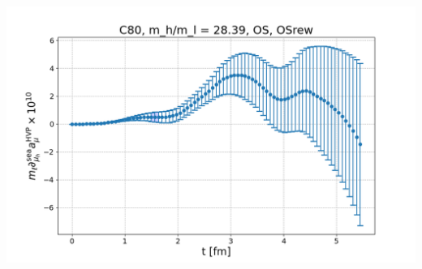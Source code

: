 \documentclass[xcolor={dvipsnames,table}]{beamer}
\begin{document}
\begin{frame}
\begin{columns}
\begin{column}{0.5\textwidth}
     \includegraphics[trim=0cm 0.3cm 0cm 1.2cm, clip,width=\textwidth]{plots/der_mq_sea_lore/amu_C80_OS_der_028ml.png}
    \end{column}
   \end{columns}
\end{frame}
\end{document}
